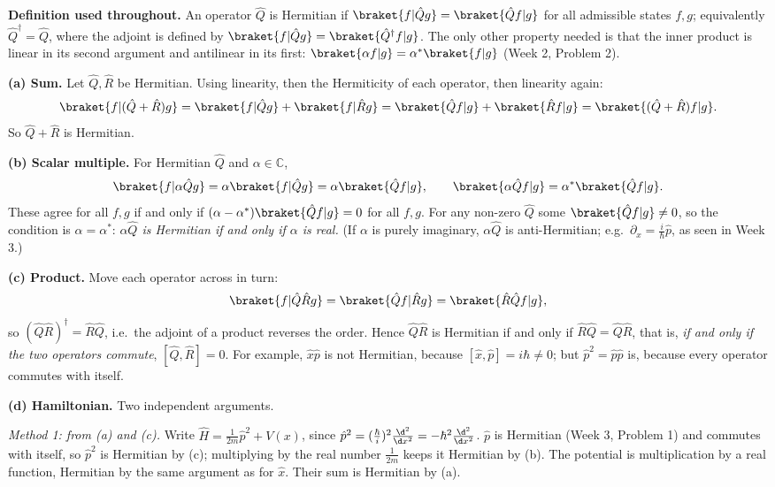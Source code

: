 \begin{solutionbox}
\textbf{Definition used throughout.} An operator $\hat Q$ is Hermitian if $\braket{f|\hat Qg}=\braket{\hat Qf|g}$ for all admissible states $f,g$; equivalently $\hat Q^\dagger=\hat Q$, where the adjoint is defined by $\braket{f|\hat Qg}=\braket{\hat Q^\dagger f|g}$. The only other property needed is that the inner product is linear in its second argument and antilinear in its first: $\braket{\alpha f|g}=\alpha^*\braket{f|g}$ (Week 2, Problem 2).

\textbf{(a) Sum.} Let $\hat Q,\hat R$ be Hermitian. Using linearity, then the Hermiticity of each operator, then linearity again:
\[
\braket{f|(\hat Q+\hat R)g}=\braket{f|\hat Qg}+\braket{f|\hat Rg}=\braket{\hat Qf|g}+\braket{\hat Rf|g}=\braket{(\hat Q+\hat R)f|g}.
\]
So $\hat Q+\hat R$ is Hermitian.

\textbf{(b) Scalar multiple.} For Hermitian $\hat Q$ and $\alpha\in\mathbb C$,
\[
\braket{f|\alpha\hat Qg}=\alpha\braket{f|\hat Qg}=\alpha\braket{\hat Qf|g},\qquad
\braket{\alpha\hat Qf|g}=\alpha^*\braket{\hat Qf|g}.
\]
These agree for all $f,g$ if and only if $(\alpha-\alpha^*)\braket{\hat Qf|g}=0$ for all $f,g$. For any non-zero $\hat Q$ some $\braket{\hat Qf|g}\neq0$, so the condition is $\alpha=\alpha^*$: \emph{$\alpha\hat Q$ is Hermitian if and only if $\alpha$ is real.} (If $\alpha$ is purely imaginary, $\alpha\hat Q$ is anti-Hermitian; e.g.\ $\partial_x=\frac{i}{\hbar}\hat p$, as seen in Week 3.)

\textbf{(c) Product.} Move each operator across in turn:
\[
\braket{f|\hat Q\hat Rg}=\braket{\hat Qf|\hat Rg}=\braket{\hat R\hat Qf|g},
\]
so $(\hat Q\hat R)^\dagger=\hat R\hat Q$, i.e.\ the adjoint of a product reverses the order. Hence $\hat Q\hat R$ is Hermitian if and only if $\hat R\hat Q=\hat Q\hat R$, that is, \emph{if and only if the two operators commute}, $[\hat Q,\hat R]=0$. For example, $\hat x\hat p$ is not Hermitian, because $[\hat x,\hat p]=i\hbar\neq0$; but $\hat p^2=\hat p\hat p$ is, because every operator commutes with itself.

\textbf{(d) Hamiltonian.} Two independent arguments.

\emph{Method 1: from (a) and (c).} Write $\hat H=\frac{1}{2m}\hat p^2+V(x)$, since $\hat p^2=(\frac{\hbar}{i})^2\frac{\d^2}{\d x^2}=-\hbar^2\frac{\d^2}{\d x^2}$. $\hat p$ is Hermitian (Week 3, Problem 1) and commutes with itself, so $\hat p^2$ is Hermitian by (c); multiplying by the real number $\frac{1}{2m}$ keeps it Hermitian by (b). The potential is multiplication by a real function, Hermitian by the same argument as for $\hat x$. Their sum is Hermitian by (a).


\end{solutionbox}
